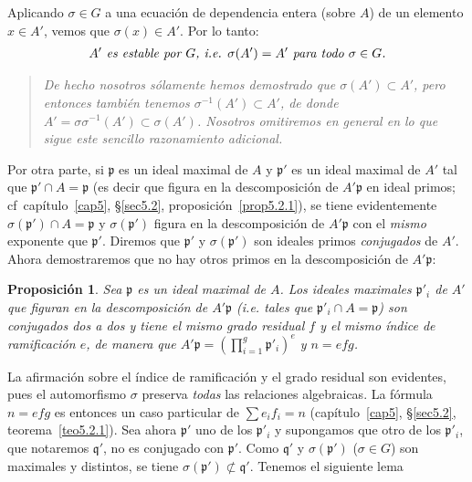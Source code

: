 \documentclass[bibtotoc,leqno,spanish]{amsbook}
\newcommand{\idl}[1]{\mathfrak{#1}}
\numberwithin{equation}{section}
\newenvironment{comm}%
	{\begin{quotation}\itshape\Small}
	{\end{quotation}}
\theoremstyle{note}
\theoremstyle{note}
\newtheorem{proposition}{Proposici\'on}
\theoremstyle{rem}
\numberwithin{theorem}{section}
\numberwithin{proposition}{section}
\numberwithin{definition}{section}
\numberwithin{lemma}{section}
\numberwithin{corollary}{section}
\numberwithin{example}{section}
\numberwithin{footnote}{section}%
\begin{document}
Aplicando $\sigma\in G$ a una ecuaci\'on de dependencia entera (sobre $A$) de un elemento $x\in A'$, vemos
que $\sigma(x)\in A'$. Por lo tanto:
\begin{gather}\label{eq6.2.1}
\text{\itshape $A'$ es estable por $G$, i.e. $\sigma(A')=A'$ para todo $\sigma\in G$.}
\end{gather}

\begin{comm}
De hecho nosotros s\'olamente hemos demostrado que $\sigma(A')\subset A'$, pero entonces tambi\'en
tenemos $\sigma^{-1}(A')\subset A'$, de donde $A'=\sigma\sigma^{-1}(A')\subset\sigma(A')$. Nosotros
omitiremos en general en lo que sigue este sencillo razonamiento adicional.
\end{comm}

Por otra parte, si $\idl{p}$ es un ideal maximal de $A$ y $\idl{p}'$ es un ideal maximal de $A'$ tal que
$\idl{p}'\cap A=\idl{p}$ (es decir que figura en la descomposici\'on de $A'\idl{p}$ en ideal primos;
cf~cap\'itulo~\ref{cap5}, \S\ref{sec5.2}, proposici\'on~\ref{prop5.2.1}),
se tiene evidentemente $\sigma(\idl{p}')\cap A=\idl{p}$ y
$\sigma(\idl{p}')$ figura en la descomposici\'on de $A'\idl{p}$ con el {\em mismo} exponente que $\idl{p}'$.
Diremos que $\idl{p}'$ y $\sigma(\idl{p}')$ son ideales primos {\em conjugados} de $A'$. Ahora demostraremos
que no hay otros primos en la descomposici\'on de $A'\idl{p}$:

\begin{proposition}\label{prop6.2.1}
Sea $\idl{p}$ es un ideal maximal de $A$. Los ideales maximales $\idl{p}'_{i}$ de $A'$ que figuran en
la descomposici\'on de $A'\idl{p}$ (i.e. tales que $\idl{p}'_{i}\cap A=\idl{p}$) son conjugados dos a dos
y tiene el mismo grado residual $f$ y el mismo \'indice de ramificaci\'on $e$, de manera que
$A'\idl{p} = \left(\prod_{i=1}^{g}\idl{p}'_{i}\right)^{e}$ y $n=efg$.
\end{proposition}

La afirmaci\'on sobre el \'indice de ramificaci\'on y el grado residual son evidentes, pues el automorfismo
$\sigma$ preserva {\em todas} las relaciones algebraicas. La f\'ormula $n=efg$ es entonces un caso particular
de $\sum e_{i}f_{i}=n$ (cap\'itulo~\ref{cap5}, \S\ref{sec5.2}, teorema~\ref{teo5.2.1}). Sea ahora $\idl{p}'$ uno de los $\idl{p}'_{i}$
y supongamos que otro de los $\idl{p}'_{i}$, que notaremos $\idl{q}'$, no es conjugado con $\idl{p}'$.
Como $\idl{q}'$ y $\sigma(\idl{p}')$ ($\sigma\in G$) son maximales y distintos, se tiene $\sigma(\idl{p}')\not\subset\idl{q}'$.
Tenemos el siguiente lema
\end{document}
